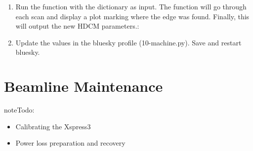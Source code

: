 \documentclass[letterpaper,10pt,english]{sphinxmanual}
\begin{document}
\begin{description}
\begin{enumerate}
\begin{sphinxVerbatim}[commandchars=\\\{\}]
 \PYG{p}{[}\PYG{p}{]}     
                               
                               
                               
                               
                               
\end{sphinxVerbatim}

\item {} 
Run the  function with the dictionary as input. The function will go through each scan and display a plot marking where the edge was found. Finally, this will output the new HDCM parameters.:

\begin{sphinxVerbatim}[commandchars=\\\{\}]
 \PYG{p}{[}\PYG{p}{]}  
\end{sphinxVerbatim}

\item {} 
Update the values in the bluesky profile (10-machine.py). Save and restart bluesky.

\end{enumerate}

\end{description}


\section{Beamline Maintenance}
\label{\detokenize{staff:beamline-maintenance}}
\begin{sphinxadmonition}{note}{\label{staff:index-2}Todo:}\begin{itemize}
\item {} 
Calibrating the Xspress3

\item {} 
Power loss preparation and recovery

\end{itemize}
\end{sphinxadmonition}
\end{document}
